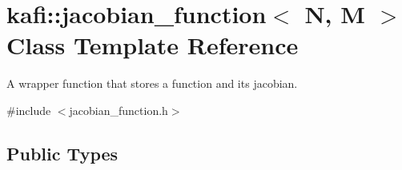 \hypertarget{classkafi_1_1jacobian__function}{}\section{kafi\+:\+:jacobian\+\_\+function$<$ N, M $>$ Class Template Reference}
\label{classkafi_1_1jacobian__function}


A wrapper function that stores a function and its jacobian.  




{\ttfamily \#include $<$jacobian\+\_\+function.\+h$>$}

\subsection*{Public Types}
